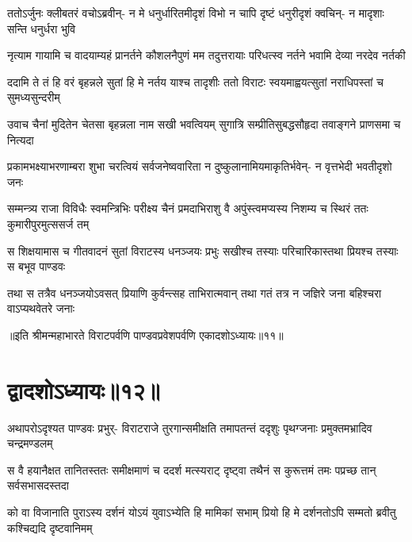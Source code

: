 \fourlineindentedshloka
{ततोऽर्जुनः क्लीबतरं वचोऽब्रवीन्-}
{न मे धनुर्धारितमीदृशं विभो}
{न चापि दृष्टं धनुरीदृशं क्वचिन्-}
{न मादृशाः सन्ति धनुर्धरा भुवि}


\fourlineindentedshloka
{नृत्याम गायामि च वादयाम्यहं}
{प्रानर्तने कौशलनैपुणं मम}
{तदुत्तरायाः परिधत्स्व नर्तने}
{भवामि देव्या नरदेव नर्तकी}




\fourlineindentedshloka
{ददामि ते तं हि वरं बृहन्नले}
{सुतां हि मे नर्तय याश्च तादृशीः}
{ततो विराटः स्वयमाह्वयत्सुतां}
{नराधिपस्तां च सुमध्यसुन्दरीम्}


\fourlineindentedshloka
{उवाच चैनां मुदितेन चेतसा}
{बृहन्नला नाम सखी भवत्वियम्}
{सुगात्रि सम्प्रीतिसुबद्धसौहृदा}
{तवाङ्गने प्राणसमा च नित्यदा}


\fourlineindentedshloka
{प्रकामभक्ष्याभरणाम्बरा शुभा}
{चरत्वियं सर्वजनेष्ववारिता}
{न दुष्कुलानामियमाकृतिर्भवेन्-}
{न वृत्तभेदी भवतीदृशो जनः}



\fourlineindentedshloka
{सम्मन्त्र्य राजा विविधैः स्वमन्त्रिभिः}
{परीक्ष्य चैनं प्रमदाभिराशु वै}
{अपुंस्त्वमप्यस्य निशम्य च स्थिरं}
{ततः कुमारीपुरमुत्ससर्ज तम्}


\fourlineindentedshloka
{स शिक्षयामास च गीतवादनं}
{सुतां विराटस्य धनञ्जयः प्रभुः}
{सखीश्च तस्याः परिचारिकास्तथा}
{प्रियश्च तस्याः स बभूव पाण्डवः}


\fourlineindentedshloka
{तथा स तत्रैव धनञ्जयोऽवसत्}
{प्रियाणि कुर्वन्त्सह ताभिरात्मवान्}
{तथा गतं तत्र न जज्ञिरे जना}
{बहिश्चरा वाऽप्यथवेतरे जनाः}

॥इति श्रीमन्महाभारते विराटपर्वणि पाण्डवप्रवेशपर्वणि एकादशोऽध्यायः॥११॥

\chapter{द्वादशोऽध्यायः॥१२॥}

\fourlineindentedshloka
{अथापरोऽदृश्यत पाण्डवः प्रभुर्-}
{विराटराजे तुरगान्समीक्षति}
{तमापतन्तं ददृशुः पृथग्जनाः}
{प्रमुक्तमभ्रादिव चन्द्रमण्डलम्}


\fourlineindentedshloka
{स वै हयानैक्षत तानितस्ततः}
{समीक्षमाणं च ददर्श मत्स्यराट्}
{दृष्ट्वा तथैनं स कुरूत्तमं तमः}
{पप्रच्छ तान् सर्वसभासदस्तदा}


\fourlineindentedshloka
{को वा विजानाति पुराऽस्य दर्शनं}
{योऽयं युवाऽभ्येति हि मामिकां सभाम्}
{प्रियो हि मे दर्शनतोऽपि सम्मतो}
{ब्रवीतु कश्चिद्यदि दृष्टवानिमम्}


